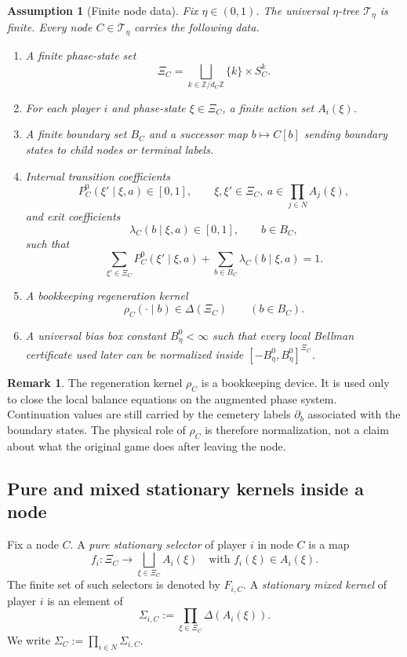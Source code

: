 \documentclass[12pt]{article}
\newtheorem{assumption}[theorem]{Assumption}
\theoremstyle{definition}
\newtheorem{remark}[theorem]{Remark}
\newcommand{\1}{\mathbf{1}}
\newcommand{\cT}{\mathcal{T}}
\begin{document}
\begin{assumption}[Finite node data]
\label{ass:node-data}
Fix $\eta\in(0,1)$.  The universal $\eta$-tree $\cT_\eta$ is finite.  Every node
$C\in \cT_\eta$ carries the following data.
\begin{enumerate}[label=\textnormal{(D\arabic*)},leftmargin=2.8em]
\item A finite phase-state set
\[
\Xi_C=\bigsqcup_{k\in\mathbb Z/d_C\mathbb Z}\{k\}\times S_C^k.
\]
\item For each player $i$ and phase-state $\xi\in\Xi_C$, a finite action set
$A_i(\xi)$.
\item A finite boundary set $B_C$ and a successor map $b\mapsto C[b]$ sending
boundary states to child nodes or terminal labels.
\item Internal transition coefficients
\[
P_C^0(\xi'\mid \xi,a)\in[0,1],
\qquad \xi,\xi'\in \Xi_C,
\ a\in \prod_{j\in N}A_j(\xi),
\]
and exit coefficients
\[
\lambda_C(b\mid \xi,a)\in[0,1],
\qquad b\in B_C,
\]
such that
\[
\sum_{\xi'\in\Xi_C}P_C^0(\xi'\mid \xi,a)+\sum_{b\in B_C}\lambda_C(b\mid\xi,a)=1.
\]
\item A bookkeeping regeneration kernel
\[
\rho_C(\cdot\mid b)\in \Delta(\Xi_C)
\qquad (b\in B_C).
\]
\item A universal bias box constant $B_\eta^0<\infty$ such that every local Bellman
certificate used later can be normalized inside
$[-B_\eta^0,B_\eta^0]^{\Xi_C}$.
\end{enumerate}
\end{assumption}

\begin{remark}
The regeneration kernel $\rho_C$ is a bookkeeping device.  It is used only to
close the local balance equations on the augmented phase system.  Continuation
values are still carried by the cemetery labels $\partial_b$ associated with the
boundary states.  The physical role of $\rho_C$ is therefore normalization, not a
claim about what the original game does after leaving the node.
\end{remark}

\subsection{Pure and mixed stationary kernels inside a node}

Fix a node $C$.  A \emph{pure stationary selector} of player $i$ in node $C$ is a
map
\[
f_i: \Xi_C\to \bigsqcup_{\xi\in\Xi_C}A_i(\xi)
\quad\text{with }f_i(\xi)\in A_i(\xi).
\]
The finite set of such selectors is denoted by $F_{i,C}$.  A \emph{stationary
mixed kernel} of player $i$ is an element of
\[
\Sigma_{i,C}:=\prod_{\xi\in\Xi_C}\Delta(A_i(\xi)).
\]
We write $\Sigma_C:=\prod_{i\in N}\Sigma_{i,C}$.
\end{document}
